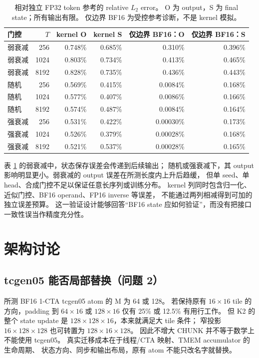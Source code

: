 \documentclass[11pt,a4paper,fontset=none]{ctexart}
\begin{document}
\begin{table}[htbp]\centering\small
\begin{tabular}{lrrrrr}\toprule
门控&\(T\)&kernel O&kernel S&仅边界 BF16：O&仅边界 BF16：S\\\midrule
弱衰减&256&0.748\%&0.685\%&0.310\%&0.396\%\\
弱衰减&1024&0.803\%&0.734\%&0.413\%&0.465\%\\
弱衰减&8192&0.828\%&0.735\%&0.436\%&0.443\%\\
随机&256&0.569\%&0.415\%&0.0084\%&0.168\%\\
随机&1024&0.577\%&0.407\%&0.0086\%&0.166\%\\
随机&8192&0.574\%&0.487\%&0.0084\%&0.164\%\\
强衰减&256&0.531\%&0.422\%&0.00030\%&0.173\%\\
强衰减&1024&0.526\%&0.379\%&0.00028\%&0.168\%\\
强衰减&8192&0.521\%&0.537\%&0.00028\%&0.165\%\\\bottomrule
\end{tabular}
\caption{相对独立 FP32 token 参考的 relative \(L_2\) error。
O 为 output，S 为 final state；所有输出有限。
仅边界 BF16 为受控参考诊断，不是 kernel 模拟。}
\label{tab:precision}
\end{table}

表 \ref{tab:precision} 的弱衰减中，状态保存误差会传递到后续输出；
随机或强衰减下，其 output 影响明显更小。弱衰减的 output 误差在所测长度内上升后趋缓，
但单 seed、单 head、合成门控不足以保证任意长序列或训练分布。
kernel 列同时包含归一化、近似门控、BF16 operand、FP16 inverse 等误差，
不能通过两列相减得到可加的独立误差预算。
这一验证设计能够回答“BF16 state 应如何验证”，而没有把接口一致性误当作精度充分性。

\section{架构讨论}
\subsection{tcgen05 能否局部替换（问题 2）}
所测 BF16 1-CTA tcgen05 atom 的 M 为 64 或 128\cite{ptx,cutlass}。
若保持原有 \(16\times16\) tile 的方向，padding 到 \(64\times16\) 或
\(128\times16\) 仅有 25\% 或 12.5\% 有用行工作。
但 K2 的整个 state update 是 \(128\times128\times16\)，本来就满足大 tile 条件；
窄投影 \(16\times128\times128\) 也可转置为 \(128\times16\times128\)。
因此不增大 CHUNK 并不等于数学上不能使用 tcgen05。
真实迁移成本在于线程/CTA 映射、TMEM accumulator 的生命周期、
状态方向、同步和输出布局，原有 atom 不能只改名字就替换。

\end{document}
